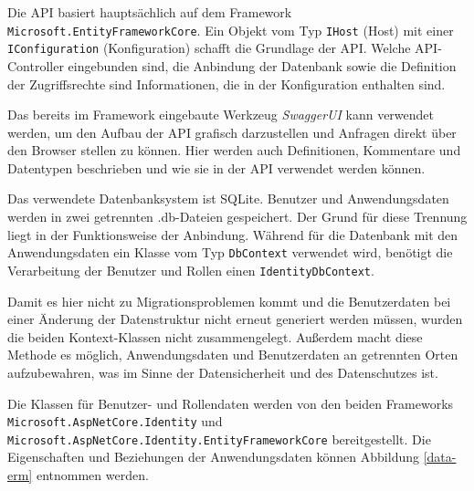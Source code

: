 Die API basiert hauptsächlich auf dem Framework \texttt{Microsoft.Entity\-Framework\-Core}.
Ein Objekt vom Typ \texttt{IHost} (Host) mit einer \texttt{IConfiguration} (Konfiguration) schafft die Grundlage der API.
Welche API-Controller eingebunden sind, die Anbindung der Datenbank sowie die Definition der Zugriffsrechte sind Informationen, die in der Konfiguration enthalten sind.

Das bereits im Framework eingebaute Werkzeug \emph{SwaggerUI} kann verwendet werden, um den Aufbau der API grafisch darzustellen und Anfragen direkt über den Browser stellen zu können.
Hier werden auch Definitionen, Kommentare und Datentypen beschrieben und wie sie in der API verwendet werden können.

Das verwendete Datenbanksystem ist SQLite.
Benutzer und Anwendungsdaten werden in zwei getrennten .db-Dateien gespeichert.
Der Grund für diese Trennung liegt in der Funktionsweise der Anbindung.
Während für die Datenbank mit den Anwendungsdaten ein Klasse vom Typ \texttt{DbContext} verwendet wird, benötigt die Verarbeitung der Benutzer und Rollen einen \texttt{IdentityDbContext}.

Damit es hier nicht zu Migrationsproblemen kommt und die Benutzerdaten bei einer Änderung der Datenstruktur  nicht erneut generiert werden müssen, wurden die beiden Kontext-Klassen nicht zusammengelegt.
Außerdem macht diese Methode es möglich, Anwendungsdaten und Benutzerdaten an getrennten Orten aufzubewahren, was im Sinne der Datensicherheit und des Datenschutzes ist.

Die Klassen für Benutzer- und Rollendaten werden von den beiden Frameworks \texttt{Microsoft.\-AspNetCore\-.Identity} und \texttt{Microsoft.\-AspNetCore.\-Identity.\-Entity\-Framework\-Core} bereitgestellt. 
Die Eigenschaften und Beziehungen der Anwendungsdaten können Abbildung \vref{data-erm} entnommen werden.

